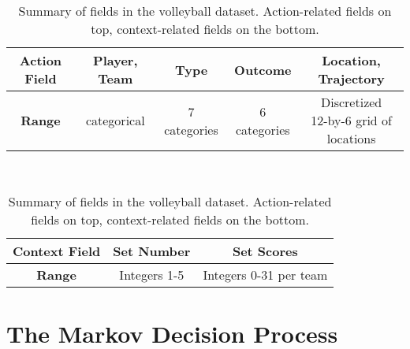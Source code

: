\documentclass{sfuthesis}
\begin{document}
	\begin{table}[ht]
		\centering
		\begin{tabular}{c|c|c|c|c}
			\textbf{Action Field} & \textbf{Player, Team} & \textbf{Type} & \textbf{Outcome} & \textbf{Location, Trajectory}         \\ \hline
			\textbf{Range} & categorical           & 7 categories  & 6 categories     & \makecell[c]{Discretized\\ 12-by-6 grid of locations}
		\end{tabular}
		\\ \vspace{0.75cm}
		\begin{tabular}{c|c|c}
			\textbf{Context Field} & \textbf{Set Number} & \textbf{Set Scores}    \\ \hline
			\textbf{Range} & Integers 1-5        & Integers 0-31 per team
		\end{tabular}
		\caption{Summary of fields in the volleyball dataset. Action-related fields on top, context-related fields on the bottom.}
		\label{tab:data-fields}
	\end{table}

	\section{The Markov Decision Process}
	\label{section-mdp}
	
\end{document}
